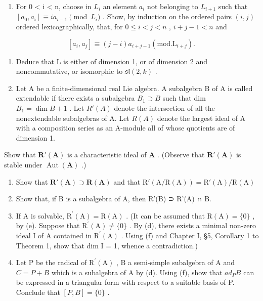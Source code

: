 \begin{enumerate}
\def\labelenumi{(\alph{enumi})}
\setcounter{enumi}{1}
\tightlist
\item
  For 0 \textless{} i \textless{} n, choose in \(L_{i}\) an element \(a_{i}\) not belonging to \(L_{i+1}\) such that \([a_{0}, a_{i}] \equiv ia_{i-1} \pmod{L_{i}}\) . Show, by induction on the ordered pairs \((i, j)\) ordered lexicographically, that, for \(0 \leqslant i < j < n\) , \(i + j - 1 < n\) and
\end{enumerate}

\[
[ a _ {i}, a _ {j} ] \equiv (j - i) a _ {i + j - 1} (\mathrm{mod}. \mathrm{L} _ {i + j}).
\]

\begin{enumerate}
\def\labelenumi{(\alph{enumi})}
\setcounter{enumi}{2}
\item
  Deduce that L is either of dimension 1, or of dimension 2 and noncommutative, or isomorphic to \(\mathfrak{sl}(2,k)\) .
\item
  Let A be a finite-dimensional real Lie algebra. A subalgebra B of A is called extendable if there exists a subalgebra \(B_{1} \supset B\) such that dim \(B_{1} = \dim B + 1\) . Let \(R'(A)\) denote the intersection of all the nonextendable subalgebras of A. Let \(R(A)\) denote the largest ideal of A with a composition series as an A-module all of whose quotients are of dimension 1.
\end{enumerate}

Show that \(\mathbf{R}'(\mathbf{A})\) is a characteristic ideal of \(\mathbf{A}\) . (Observe that \(\mathbf{R}'(\mathbf{A})\) is stable under \(\operatorname{Aut}(\mathbf{A})\) .)

\begin{enumerate}
\def\labelenumi{(\alph{enumi})}
\setcounter{enumi}{4}
\item
  Show that \(\mathbf{R}'(\mathbf{A})\supset \mathbf{R}(\mathbf{A})\) and that \(\mathrm{R}'(\mathrm{A} / \mathrm{R}(\mathrm{A})) = \mathrm{R}'(\mathrm{A}) / \mathrm{R}(\mathrm{A})\)
\item
  Show that, if B is a subalgebra of A, then R'(B) ⊃ R'(A) ∩ B.
\item
  If A is solvable, \(\mathrm{R}^{\prime}(\mathrm{A}) = \mathrm{R}(\mathrm{A})\) . (It can be assumed that \(\mathrm{R}(\mathrm{A}) = \{0\}\) , by (e). Suppose that \(\mathrm{R}^{\prime}(\mathrm{A}) \neq \{0\}\) . By (d), there exists a minimal non-zero ideal I of A contained in \(\mathrm{R}^{\prime}(\mathrm{A})\) . Using (f) and Chapter I, §5, Corollary 1 to Theorem 1, show that dim I = 1, whence a contradiction.)
\item
  Let P be the radical of \(\mathrm{R}^{\prime}(\mathrm{A})\) , B a semi-simple subalgebra of A and \(C = P + B\) which is a subalgebra of A by (d). Using (f), show that \(ad_{P}B\) can be expressed in a triangular form with respect to a suitable basis of P. Conclude that \([P, B] = \{0\}\) .
\end{enumerate}

